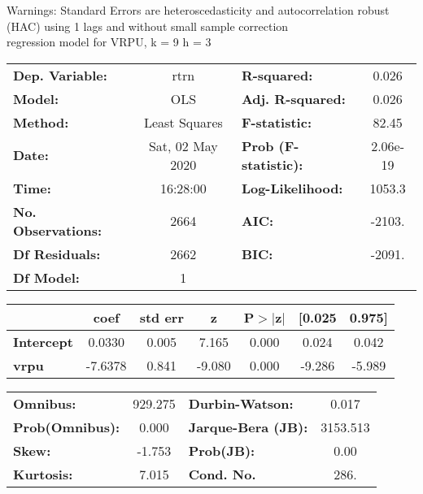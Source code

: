 Warnings: \newline
 [1] Standard Errors are heteroscedasticity and autocorrelation robust (HAC) using 1 lags and without small sample correction\\ 

regression model for VRPU, k = 9 h = 3\begin{center}
\begin{tabular}{lclc}
\toprule
\textbf{Dep. Variable:}    &       rtrn       & \textbf{  R-squared:         } &     0.026   \\
\textbf{Model:}            &       OLS        & \textbf{  Adj. R-squared:    } &     0.026   \\
\textbf{Method:}           &  Least Squares   & \textbf{  F-statistic:       } &     82.45   \\
\textbf{Date:}             & Sat, 02 May 2020 & \textbf{  Prob (F-statistic):} &  2.06e-19   \\
\textbf{Time:}             &     16:28:00     & \textbf{  Log-Likelihood:    } &    1053.3   \\
\textbf{No. Observations:} &        2664      & \textbf{  AIC:               } &    -2103.   \\
\textbf{Df Residuals:}     &        2662      & \textbf{  BIC:               } &    -2091.   \\
\textbf{Df Model:}         &           1      & \textbf{                     } &             \\
\bottomrule
\end{tabular}
\begin{tabular}{lcccccc}
                   & \textbf{coef} & \textbf{std err} & \textbf{z} & \textbf{P$> |$z$|$} & \textbf{[0.025} & \textbf{0.975]}  \\
\midrule
\textbf{Intercept} &       0.0330  &        0.005     &     7.165  &         0.000        &        0.024    &        0.042     \\
\textbf{vrpu}      &      -7.6378  &        0.841     &    -9.080  &         0.000        &       -9.286    &       -5.989     \\
\bottomrule
\end{tabular}
\begin{tabular}{lclc}
\textbf{Omnibus:}       & 929.275 & \textbf{  Durbin-Watson:     } &    0.017  \\
\textbf{Prob(Omnibus):} &   0.000 & \textbf{  Jarque-Bera (JB):  } & 3153.513  \\
\textbf{Skew:}          &  -1.753 & \textbf{  Prob(JB):          } &     0.00  \\
\textbf{Kurtosis:}      &   7.015 & \textbf{  Cond. No.          } &     286.  \\
\bottomrule
\end{tabular}
\end{center}

